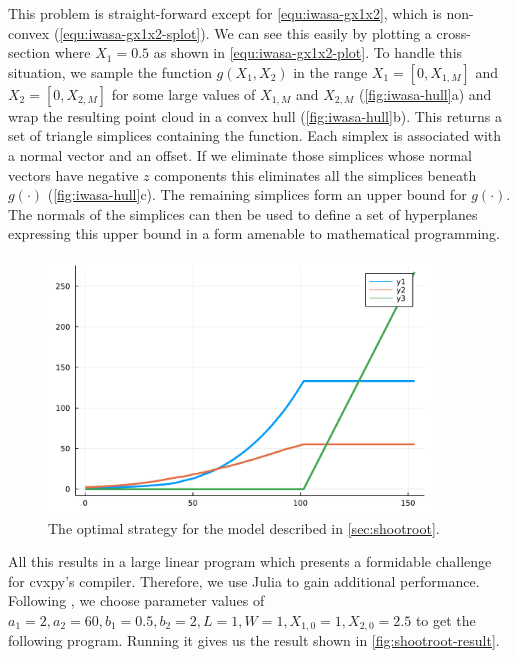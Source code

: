 \documentclass{article}
\begin{document}
This problem is straight-forward except for \autoref{equ:iwasa-gx1x2}, which is non-convex (\autoref{equ:iwasa-gx1x2-splot}). We can see this easily by plotting a cross-section where $X_1=0.5$ as shown in \autoref{equ:iwasa-gx1x2-plot}. To handle this situation, we sample the function $g(X_1, X_2)$ in the range $X_1=[0,X_{1,M}]$ and $X_2=[0,X_{2,M}]$ for some large values of $X_{1,M}$ and $X_{2,M}$ (\autoref{fig:iwasa-hull}a) and wrap the resulting point cloud in a convex hull (\autoref{fig:iwasa-hull}b). This returns a set of triangle simplices containing the function. Each simplex is associated with a normal vector and an offset. If we eliminate those simplices whose normal vectors have negative $z$ components this eliminates all the simplices beneath $g(\cdot)$ (\autoref{fig:iwasa-hull}c). The remaining simplices form an upper bound for $g(\cdot)$. The normals of the simplices can then be used to define a set of hyperplanes expressing this upper bound in a form amenable to mathematical programming.

\begin{figure}
\centering
\includegraphics[width=4in]{imgs/iwasa1984_timeseries.pdf}
\caption{The optimal strategy for the model described in \autoref{sec:shootroot}.\label{fig:shootroot-result}}
\end{figure}

All this results in a large linear program which presents a formidable challenge for cvxpy's compiler. Therefore, we use Julia to gain additional performance. Following \citep{Iwasa1984}, we choose parameter values of $a_1=2, a_2=60, b_1=0.5, b_2=2,L=1,W=1, X_{1,0}=1, X_{2,0}=2.5$ to get the following program. Running it gives us the result shown in \autoref{fig:shootroot-result}.

\end{document}
